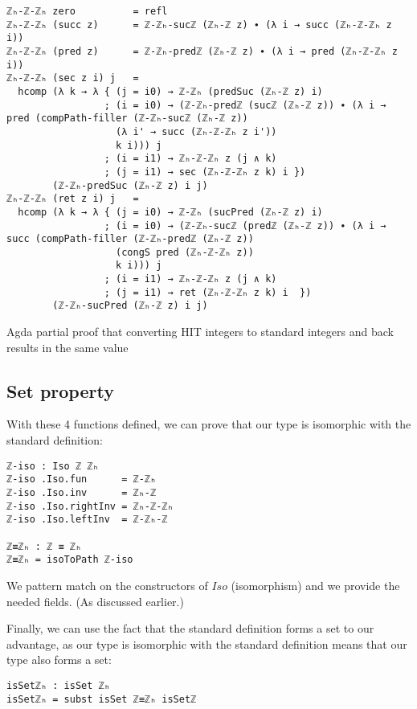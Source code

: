 \begin{listing}[H]
\begin{verbatim}
ℤₕ-ℤ-ℤₕ zero          = refl
ℤₕ-ℤ-ℤₕ (succ z)      = ℤ-ℤₕ-sucℤ (ℤₕ-ℤ z) ∙ (λ i → succ (ℤₕ-ℤ-ℤₕ z i))
ℤₕ-ℤ-ℤₕ (pred z)      = ℤ-ℤₕ-predℤ (ℤₕ-ℤ z) ∙ (λ i → pred (ℤₕ-ℤ-ℤₕ z i))
ℤₕ-ℤ-ℤₕ (sec z i) j   =
  hcomp (λ k → λ { (j = i0) → ℤ-ℤₕ (predSuc (ℤₕ-ℤ z) i)
                 ; (i = i0) → (ℤ-ℤₕ-predℤ (sucℤ (ℤₕ-ℤ z)) ∙ (λ i → pred (compPath-filler (ℤ-ℤₕ-sucℤ (ℤₕ-ℤ z))
                   (λ i' → succ (ℤₕ-ℤ-ℤₕ z i'))
                   k i))) j
                 ; (i = i1) → ℤₕ-ℤ-ℤₕ z (j ∧ k)
                 ; (j = i1) → sec (ℤₕ-ℤ-ℤₕ z k) i })
        (ℤ-ℤₕ-predSuc (ℤₕ-ℤ z) i j)
ℤₕ-ℤ-ℤₕ (ret z i) j   =
  hcomp (λ k → λ { (j = i0) → ℤ-ℤₕ (sucPred (ℤₕ-ℤ z) i)
                 ; (i = i0) → (ℤ-ℤₕ-sucℤ (predℤ (ℤₕ-ℤ z)) ∙ (λ i → succ (compPath-filler (ℤ-ℤₕ-predℤ (ℤₕ-ℤ z))
                   (congS pred (ℤₕ-ℤ-ℤₕ z))
                   k i))) j
                 ; (i = i1) → ℤₕ-ℤ-ℤₕ z (j ∧ k)
                 ; (j = i1) → ret (ℤₕ-ℤ-ℤₕ z k) i  })
        (ℤ-ℤₕ-sucPred (ℤₕ-ℤ z) i j)
\end{verbatim}
\caption{Agda partial proof that converting HIT integers to standard integers and back results in the same value}
\end{listing}

\subsection{Set property}
With these 4 functions defined, we can prove that our type is isomorphic with the standard definition:
\begin{verbatim}
ℤ-iso : Iso ℤ ℤₕ
ℤ-iso .Iso.fun      = ℤ-ℤₕ
ℤ-iso .Iso.inv      = ℤₕ-ℤ
ℤ-iso .Iso.rightInv = ℤₕ-ℤ-ℤₕ
ℤ-iso .Iso.leftInv  = ℤ-ℤₕ-ℤ

ℤ≡ℤₕ : ℤ ≡ ℤₕ
ℤ≡ℤₕ = isoToPath ℤ-iso
\end{verbatim}
We pattern match on the constructors of $Iso$ (isomorphism) and we provide the needed fields. (As discussed earlier.)

Finally, we can use the fact that the standard definition forms a set to our advantage, as our type is isomorphic with the standard definition means that our type also forms a set:
\begin{verbatim}
isSetℤₕ : isSet ℤₕ
isSetℤₕ = subst isSet ℤ≡ℤₕ isSetℤ
\end{verbatim}
